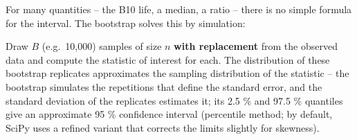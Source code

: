 \documentclass[
  letterpaper,
  DIV=11,
  numbers=noendperiod]{scrreprt}
\begin{document}
For many quantities -- the B10 life, a median, a ratio -- there is no
simple formula for the interval. The bootstrap solves this by
simulation:

\begin{tcolorbox}[enhanced jigsaw, left=2mm, title=\textcolor{quarto-callout-note-color}{\faInfo}\hspace{0.5em}{Definition: Bootstrap}, opacityback=0, breakable, rightrule=.15mm, arc=.35mm, toptitle=1mm, colbacktitle=quarto-callout-note-color!10!white, opacitybacktitle=0.6, coltitle=black, colframe=quarto-callout-note-color-frame, bottomrule=.15mm, leftrule=.75mm, bottomtitle=1mm, titlerule=0mm, toprule=.15mm, colback=white]

Draw \(B\) (e.g.~10,000) samples of size \(n\) \textbf{with replacement}
from the observed data and compute the statistic of interest for each.
The distribution of these bootstrap replicates approximates the sampling
distribution of the statistic -- the bootstrap simulates the repetitions
that define the standard error, and the standard deviation of the
replicates estimates it; its 2.5 \% and 97.5 \% quantiles give an
approximate 95 \% confidence interval (percentile method; by default,
SciPy uses a refined variant that corrects the limits slightly for
skewness).

\end{tcolorbox}
\end{document}
